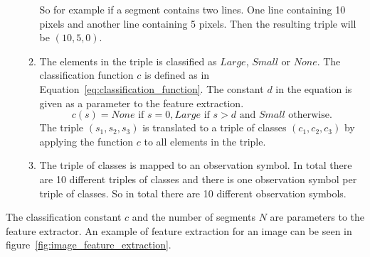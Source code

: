\begin{enumerate}
\begin{enumerate}
    So for example if a segment contains two lines. 
    One line containing 10 pixels and another line containing 5 pixels. 
    Then the resulting triple will be $(10,5,0)$.
    \item The elements in the triple is classified as $Large$, $Small$ or $None$. 
    The classification function $c$ is defined as in Equation~\ref{eq:classification_function}. 
    The constant $d$ in the equation is given as a parameter to the feature extraction.
    \begin{equation}\label{eq:classification_function}
    c(s) = None \text{ if } s = 0, Large \text{ if } s > d \text{ and } Small \text{ otherwise}.
    \end{equation}
    The triple $(s_{1},s_{2},s_{3})$ is translated to a triple of classes $(c_{1},c_{2},c_{3})$ by applying the function $c$ to all elements in the triple.
    \item The triple of classes is mapped to an observation symbol.
    In total there are 10 different triples of classes and there is one observation symbol per triple of classes. 
    So in total there are 10 different observation symbols. 
  \end{enumerate}  
\end{enumerate}

The classification constant $c$ and the number of segments $N$ are parameters to the feature extractor. 
An example of feature extraction for an image can be seen in figure~\ref{fig:image_feature_extraction}.